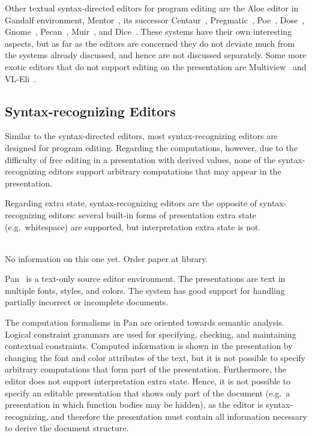 Other textual syntax-directed editors for program editing are the Aloe editor in Gandalf environment\cite{notkin85gandalf}, Mentor~\cite{donzeau84mentor}, its successor Centaur~\cite{borras88centaur}, Pregmatic~\cite{brand92pregmatic}, Poe~\cite{fischer84poe}, Dose~\cite{kaiser88dose}, Gnome~\cite{garlan84gnome}, Pecan~\cite{reiss84pecan}, Muir~\cite{normark88muir}, and Dice~\cite{fritzson84dice}. These systems have their own interesting aspects, but as far as the editors are concerned they do not deviate much from the systems already discussed, and hence are not discussed separately.
Some more exotic editors that do not support editing on the presentation are Multiview~\cite{read96multiview} and {VL-Eli}~\cite{kastens02vl-eli}.


%																
\subsection{Syntax-recognizing Editors}

Similar to the syntax-directed editors, most syntax-recognizing editors are designed for program editing. Regarding the computations, however, due to the difficulty of free editing in a presentation with derived values, none of the syntax-recognizing editors support arbitrary computations that may appear in the presentation.

Regarding extra state, syntax-recognizing editors are the opposite of syntax-recognizing editors: several built-in forms of presentation extra state (e.g.\ whitespace) are supported, but interpretation extra state is not. 

\bc
\toHere     %

\\

No information on this one yet. Order paper at library.

\fromHere  %
\ec


Pan~\cite{ballance92pan} is a text-only source editor environment. The presentations are text in multiple fonts, styles, and colors. The system has good support for handling partially incorrect or incomplete documents.

The computation formalisms in Pan are oriented towards semantic analysis. Logical constraint grammars are used for specifying, checking, and maintaining contextual constraints. Computed information is shown in the presentation by changing the font and color attributes of the text, but it is not possible to specify arbitrary computations that form part of the presentation. Furthermore, the editor does not support interpretation extra state. Hence, it is not possible to specify an editable presentation that shows only part of the document (e.g.\ a presentation in which function bodies may be hidden), as the editor is syntax-recognizing, and therefore the presentation must contain all information necessary to derive the document structure.

